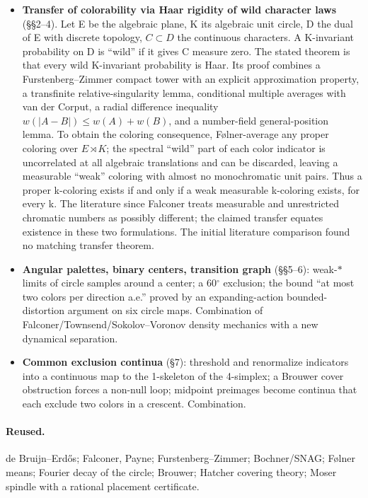 \documentclass[11pt]{article}
\begin{document}
\begin{itemize}
\item \textbf{Transfer of colorability via Haar rigidity of wild character laws} (\S{}\S{}2--4). Let E be the algebraic plane, K its algebraic unit circle, D the dual of E with discrete topology, $C\subset D$ the continuous characters. A K-invariant probability on D is ``wild'' if it gives C measure zero. The stated theorem is that every wild K-invariant probability is Haar. Its proof combines a Furstenberg--Zimmer compact tower with an explicit approximation property, a transfinite relative-singularity lemma, conditional multiple averages with van der Corput, a radial difference inequality $w(|A-B|)\le w(A)+w(B)$, and a number-field general-position lemma. To obtain the coloring consequence, Følner-average any proper coloring over $E\rtimes K$; the spectral ``wild'' part of each color indicator is uncorrelated at all algebraic translations and can be discarded, leaving a measurable ``weak'' coloring with almost no monochromatic unit pairs. Thus a proper k-coloring exists if and only if a weak measurable k-coloring exists, for every k. The literature since Falconer treats measurable and unrestricted chromatic numbers as possibly different; the claimed transfer equates existence in these two formulations. The initial literature comparison found no matching transfer theorem.
\item \textbf{Angular palettes, binary centers, transition graph} (\S{}\S{}5--6): weak-$*$ limits of circle samples around a center; a 60$^\circ$ exclusion; the bound ``at most two colors per direction a.e.'' proved by an expanding-action bounded-distortion argument on six circle maps. Combination of Falconer/Townsend/Sokolov--Voronov density mechanics with a new dynamical separation.
\item \textbf{Common exclusion continua} (\S{}7): threshold and renormalize indicators into a continuous map to the 1-skeleton of the 4-simplex; a Brouwer cover obstruction forces a non-null loop; midpoint preimages become continua that each exclude two colors in a crescent. Combination.
\end{itemize}

\paragraph{Reused.}

de Bruijn--Erd\H{o}s; Falconer, Payne; Furstenberg--Zimmer; Bochner/SNAG; Følner means; Fourier decay of the circle; Brouwer; Hatcher covering theory; Moser spindle with a rational placement certificate.
\end{document}
